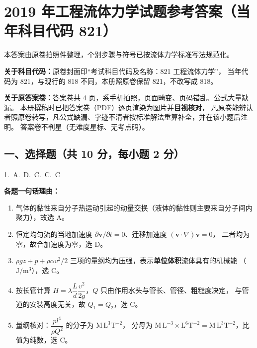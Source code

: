 \chapter{2019 年工程流体力学试题参考答案（当年科目代码 821）}

\begin{tishi}
本答案由原卷拍照件整理，个别步骤与符号已按流体力学标准写法规范化。

\textbf{关于科目代码：}原卷封面印“考试科目代码及名称：821 工程流体力学”，
当年代码为 821，与现行的 818 不同，本册照原卷保留 821，不改写成 818。

\textbf{关于原答案卷：}答案卷共 4 页，系手机拍照，页面畸变、页码错乱、公式大量缺漏。
本册撰稿时已把答案卷（PDF）逐页渲染为图片并\textbf{目视核对}，
凡原卷能辨认者照原卷转写，凡公式缺漏、字迹不清者按标准解法重算补全，并在该小题后注明。
答案卷不判星（无难度星标、无考点码）。
\end{tishi}

\section{一、选择题（共 10 分，每小题 2 分）}

\begin{center}
1.~A.~D.~C.~C.~C
\end{center}

\begin{tishi}
\textbf{各题一句话理由：}
\begin{enumerate}
  \item 气体的黏性来自分子热运动引起的动量交换（液体的黏性则主要来自分子间内聚力），故选 A。
  \item 恒定均匀流的当地加速度 $\partial\bm v/\partial t=0$、迁移加速度 $(\bm v\cdot\nabla)\bm v=0$，
        二者均为零，故合加速度为零，选 D。
  \item $\rho gz+p+\rho\alpha v^{2}/2$ 三项的量纲均为压强，表示\textbf{单位体积}流体具有的机械能
        （$\mathrm{J/m^{3}}$），选 C。
  \item 按长管计算 $H=\lambda\dfrac{L}{d}\dfrac{v^{2}}{2g}$，$Q$ 只由作用水头与管长、管径、粗糙度决定，
        与管道的安装高度无关，故 $Q_1=Q_2$，选 C。
  \item 量纲核对：$\dfrac{pl^{4}}{\rho Q^{2}}$ 的分子为 $\mathrm{M\,L^{3}T^{-2}}$，
        分母为 $\mathrm{M\,L^{-3}}\times\mathrm{L^{6}T^{-2}}=\mathrm{M\,L^{3}T^{-2}}$，比值为纯数，选 C。
\end{enumerate}
\end{tishi}

